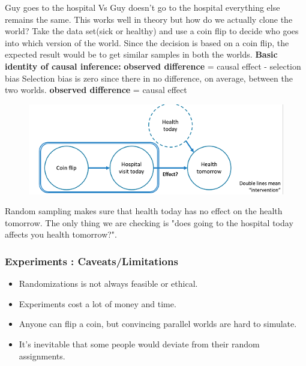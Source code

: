 \documentclass[a4paper]{article}
\begin{document}
Guy goes to the hospital Vs Guy doesn't go to the hospital everything else remains the same. \newline
This works well in theory but how do we actually clone the world? \newline
Take the data set(sick or healthy) and use a coin flip to decide who goes into which version of the world.
Since the decision is based on a coin flip, the expected result would be to get similar samples in both the worlds.\newline
\textbf{Basic identity of causal inference:} \newline
\textbf{observed difference} = causal effect - selection bias \newline
Selection bias is zero since there in no difference, on average, between the two worlds.\newline
\textbf{observed difference} = causal effect

\begin{figure}
	\includegraphics[width = \columnwidth]{image/MSD}
\end{figure}

Random sampling makes sure that health today has no effect on the health tomorrow.
The only thing we are checking is "does going to the hospital today affects you health tomorrow?".

\subsubsection{Experiments : Caveats/Limitations}
\begin{itemize}
\item Randomizations is not always feasible or ethical.
\item Experiments cost a lot of money and time.
\item Anyone can flip a coin, but convincing parallel worlds are hard to simulate.
\item It's inevitable that some people would deviate from their random assignments.
\end{itemize}
\end{document}
